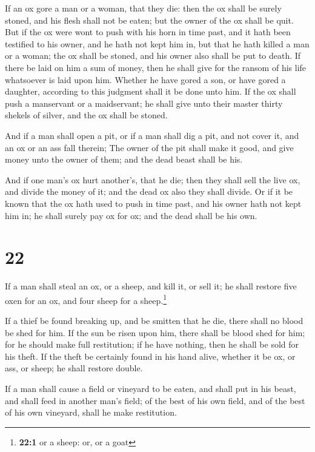  If an ox gore a man or a woman, that they die: then the
ox shall be surely stoned, and his flesh shall not be eaten; but the
owner of the ox shall be quit.  But if the ox were wont
to push with his horn in time past, and it hath been testified to his
owner, and he hath not kept him in, but that he hath killed a man or a
woman; the ox shall be stoned, and his owner also shall be put to death.
 If there be laid on him a sum of money, then he shall
give for the ransom of his life whatsoever is laid upon him.
 Whether he have gored a son, or have gored a daughter,
according to this judgment shall it be done unto him.  If
the ox shall push a manservant or a maidservant; he shall give unto
their master thirty shekels of silver, and the ox shall be stoned.

 And if a man shall open a pit, or if a man shall dig a
pit, and not cover it, and an ox or an ass fall therein; 
The owner of the pit shall make it good, and give money unto the owner
of them; and the dead beast shall be his.

 And if one man's ox hurt another's, that he die; then
they shall sell the live ox, and divide the money of it; and the dead ox
also they shall divide.  Or if it be known that the ox
hath used to push in time past, and his owner hath not kept him in; he
shall surely pay ox for ox; and the dead shall be his own.

\hypertarget{section-21}{%
\section{22}\label{section-21}}

 If a man shall steal an ox, or a sheep, and kill it, or
sell it; he shall restore five oxen for an ox, and four sheep for a
sheep.\footnote{\textbf{22:1} or a sheep: or, or a goat}

 If a thief be found breaking up, and be smitten that he
die, there shall no blood be shed for him.  If the sun be
risen upon him, there shall be blood shed for him; for he should make
full restitution; if he have nothing, then he shall be sold for his
theft.  If the theft be certainly found in his hand alive,
whether it be ox, or ass, or sheep; he shall restore double.

 If a man shall cause a field or vineyard to be eaten, and
shall put in his beast, and shall feed in another man's field; of the
best of his own field, and of the best of his own vineyard, shall he
make restitution.

